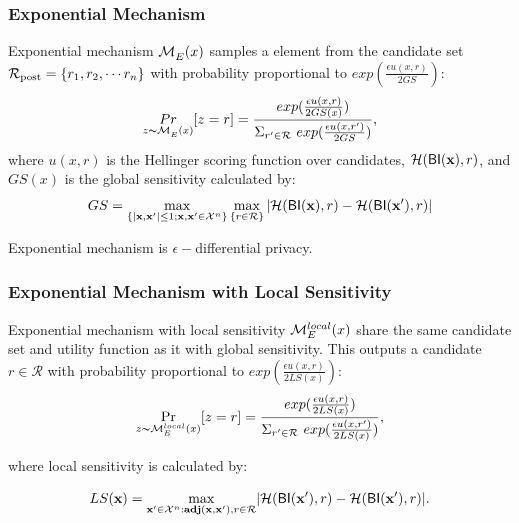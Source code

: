 \documentclass[sigconf]{acmart}
\begin{document}
\subsubsection{Exponential Mechanism}

Exponential mechanism $\mathcal{M}_E^{}({x})$ samples a element from the candidate set $\mathcal{R}_{\textup{post}} = \{r_1, r_2, \cdots r_n\}$ with probability proportional to $exp(\frac{\epsilon u(x,r)}{2 GS})$:
\begin{equation*}
\underset{z \thicksim \mathcal{M}_E^{}({x})}{Pr}[z=r] = \frac
{exp(\frac{\epsilon u(x,r)}{2 GS(x)})}
{\Sigma_{r' \in \mathcal{R}}\ exp(\frac{\epsilon u(x,r')}{2 GS})},
\end{equation*}
where $u(x,r)$ is the Hellinger scoring function over candidates, $\mathcal{H}(\mathsf{BI}(\textbf{x}), r)$, and $GS(x)$ is the global sensitivity calculated by:
\begin{equation*}
GS = 
\max_{\{|\textbf{x},\textbf{x}'| \leq 1;\textbf{x},\textbf{x}'\in \mathcal{X}^n\}}\max_{\{r\in \mathcal{R}\}}
|\mathcal{H}(\mathsf{BI}(\textbf{x}), r) - \mathcal{H}(\mathsf{BI}(\textbf{x}'), r)|
\end{equation*}

Exponential mechanism is $\epsilon -$differential privacy\cite{dwork2014algorithmic}.


\subsubsection{Exponential Mechanism with Local Sensitivity}
\label{subsec_emls}
Exponential mechanism with local sensitivity $\mathcal{M}_E^{local}({x})$ share the same candidate set and utility function as it with global sensitivity. This outputs a candidate $r \in \mathcal{R}$ with probability proportional to $exp(\frac{\epsilon u(x,r)}{2 LS(x)})$:
\begin{equation*}
\underset{z \thicksim \mathcal{M}_E^{local}({x})}{\Pr}[z=r] = \frac
{exp(\frac{\epsilon u(x,r)}{2 LS(x)})}
{\Sigma_{r' \in \mathcal{R}}\ exp(\frac{\epsilon u(x,r')}{2 LS(x)})},
\end{equation*}

where local sensitivity is calculated by:

\begin{equation*}
LS(\textbf{x})=\max_{\textbf{x}' \in \mathcal{X}^n:\textbf{adj}(\textbf{x},\textbf{x}'), r\in \mathcal{R}}\lvert \mathcal{H}(\mathsf{BI}(\textbf{x}'), r) - \mathcal{H}(\mathsf{BI}(\textbf{x}'), r)\rvert.
\end{equation*}
\end{document}
